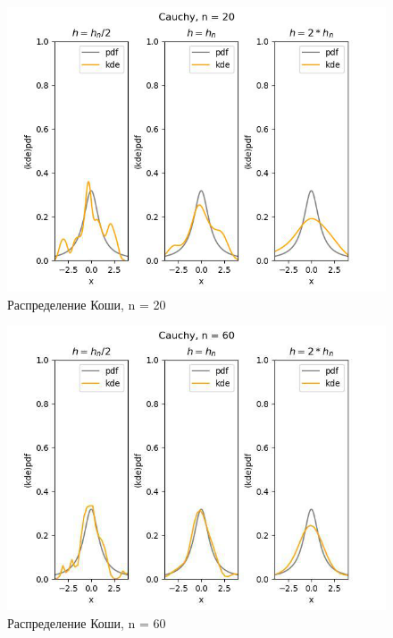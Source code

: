 \documentclass[../body.tex]{subfiles}
\begin{document}
\begin{figure}[H]
	\centering
	\includegraphics[width=\textwidth, height =0.4\textheight]{img/CauchyKDE n = 20.png}
	\caption{Распределение Коши, n = 20}
	\label{fig:cauchy_kde_20}
\end{figure}

\begin{figure}[H]
	\centering
	\includegraphics[width=\textwidth, height =0.4\textheight]{img/CauchyKDE n = 60.png}
	\caption{Распределение Коши, n = 60}
	\label{fig:cauchy_kde_60}
\end{figure}
\end{document}
